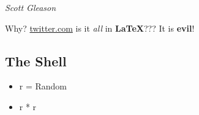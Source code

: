 \textit{Scott Gleason} 

Why? \href{Why}{twitter.com} is it \textit{all} in \textbf{LaTeX}??? It is \textbf{evil}!


\subsection{The Shell}
\begin{itemize}
\item r = Random
\item r * r
\end{itemize}